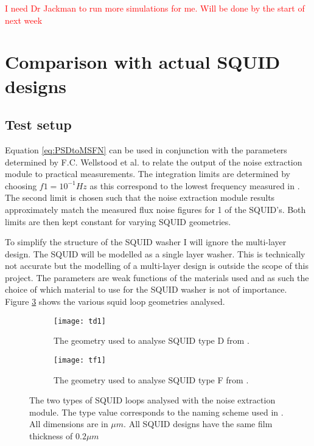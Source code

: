 \textcolor{red}{I need Dr Jackman to run more simulations for me. Will be done by the start of next week}

\section{Comparison with actual SQUID designs}
\subsection{Test setup}
Equation \ref{eq:PSDtoMSFN} can be used in conjunction with the parameters determined by F.C. Wellstood et al. \cite{FluxNoiseCol} to relate the output of the noise extraction module to practical measurements. The integration limits are determined by choosing $f1 = 10^{-1} Hz$ as this correspond to the lowest frequency measured in \cite{FluxNoiseCol}. The second limit is chosen such that the noise extraction module results approximately match the measured flux noise figures for 1 of the SQUID's. Both limits are then kept constant for varying SQUID geometries. \par
To simplify the structure of the SQUID washer I will ignore the multi-layer design. The SQUID will be modelled as a single layer washer. This is technically not accurate but the modelling of a multi-layer design is outside the scope of this project. The parameters are weak functions of the materials used and as such the choice of which material to use for the SQUID washer is not of importance. Figure \ref{fig:realCOMP} shows the various squid loop geometries analysed. 

\begin{figure}[H]
    \centering
    \begin{subfigure}[b]{0.48\textwidth}
        \centering
        \texttt{[image: td1]}
        \caption{The geometry used to analyse SQUID type D from \cite{FluxNoiseCol}.}
        \label{fig:type1D}
    \end{subfigure}
    \hfill
    \begin{subfigure}[b]{0.48\textwidth}
        \centering
        \texttt{[image: tf1]}
        \caption{The geometry used to analyse SQUID type F from \cite{FluxNoiseCol}.}
        \label{fig:type1F}
    \end{subfigure}
    \caption{The two types of SQUID loops analysed with the noise extraction module. The type value corresponds to the naming scheme used in \cite{FluxNoiseCol}. All dimensions are in $\mu m$. All SQUID designs have the same film thickness of $0.2 \mu m$}
    \label{fig:realCOMP}
\end{figure}

